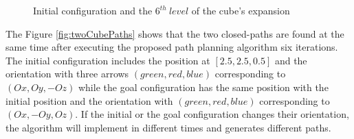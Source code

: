 \begin{center}
\begin{figure}[H]
\hfill
\caption{Initial configuration and the $6^{th}\ level$ of the cube's expansion} 
\end{figure}
\end{center}

\noindent The Figure \ref{fig:twoCubePaths} shows that the two closed-paths are found at the same time after executing the proposed path planning algorithm six iterations. The initial configuration includes the position at $[2.5,2.5,0.5]$ and the orientation with three arrows $(green,red,blue)$ corresponding to $(Ox,Oy,-Oz)$ while the goal configuration has the same position with the initial position and the orientation with $(green,red,blue)$ corresponding to $(Ox,-Oy,Oz)$. If the initial or the goal configuration changes their orientation, the algorithm will implement in different times and generates different paths.

